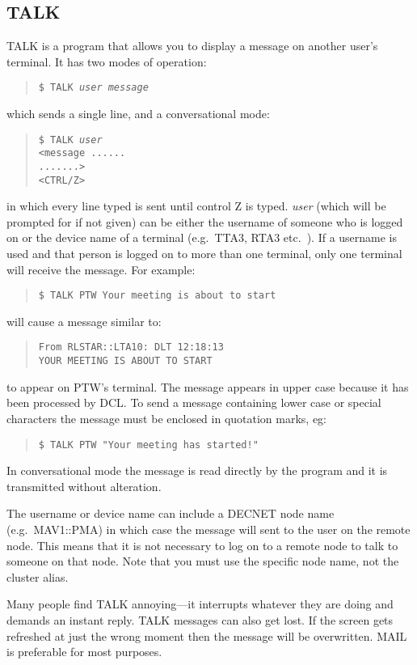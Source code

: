 \subsection{TALK}
TALK is a program that allows you to display a message on another user's
terminal.
It has two modes of operation:
\begin{quote}
{\tt \$ TALK {\em user message}}
\end{quote}
which sends a single line, and a conversational mode:
\begin{quote}
{\tt \$ TALK {\em user}\\
<message ......\\
\hspace{16mm}.......>\\
<CTRL/Z>}
\end{quote}
in which every line typed is sent until control Z is typed.
{\em user} (which will be prompted for if not given) can be either the
username of someone who is logged on or the device name of a terminal (e.g.\
TTA3, RTA3 etc.\ ).
If a username is used and that person is logged on to more than one terminal,
only one terminal will receive the message.
For example:
\begin{quote}
{\tt \$ TALK PTW Your meeting is about to start}
\end{quote}
will cause a message similar to:
\begin{quote}
{\tt From RLSTAR::LTA10: DLT          12:18:13\\
YOUR MEETING IS ABOUT TO START}
\end{quote}
to appear on PTW's terminal.
The message appears in upper case because it has been processed by DCL.
To send a message containing lower case or special characters the message must
be enclosed in quotation marks, eg:
\begin{quote}
{\tt \$ TALK PTW "Your meeting has started!"}
\end{quote}
In conversational mode the message is read directly by the program and it is
transmitted without alteration.

The username or device name can include a DECNET node name (e.g.\ MAV1::PMA) in
which case the message will sent to the user on the remote node. This means
that it is not necessary to log on to a remote node to talk to someone on that
node. Note that you must use the specific node name, not the cluster alias.

Many people find TALK annoying---it interrupts whatever they are doing and
demands an instant reply. TALK messages can also get lost. If the
screen gets refreshed at just the wrong moment then the message will be
overwritten. MAIL is preferable for most purposes.
